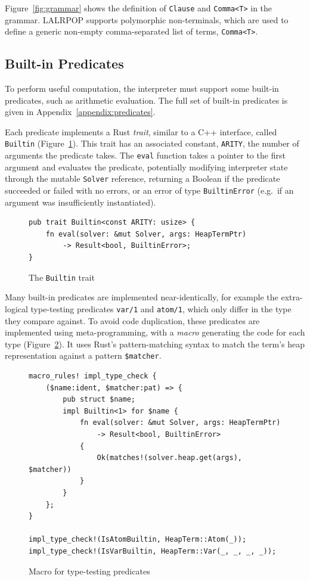 Figure~\ref{fig:grammar} shows the definition of \texttt{Clause} and \texttt{Comma<T>} in the grammar. LALRPOP supports polymorphic non-terminals, which are used to define a generic non-empty comma-separated list of terms, \texttt{Comma<T>}.

\subsection{Built-in Predicates}

\label{sec:builtins}

To perform useful computation, the interpreter must support some built-in predicates, such as arithmetic evaluation. The full set of built-in predicates is given in Appendix~\ref{appendix:predicates}.

Each predicate implements a Rust \emph{trait}, similar to a C++ interface, called \texttt{Builtin} (Figure~\ref{fig:builtin-trait}). This trait has an associated constant, \texttt{ARITY}, the number of arguments the predicate takes. The \texttt{eval} function takes a pointer to the first argument and evaluates the predicate, potentially modifying interpreter state through the mutable \texttt{Solver} reference, returning a Boolean if the predicate succeeded or failed with no errors, or an error of type \texttt{BuiltinError} (e.g.\ if an argument was insufficiently instantiated).

\begin{figure}[H]
\centering
\begin{verbatim}
pub trait Builtin<const ARITY: usize> {
    fn eval(solver: &mut Solver, args: HeapTermPtr)
        -> Result<bool, BuiltinError>;
}
\end{verbatim}
\caption{The \texttt{Builtin} trait}
\label{fig:builtin-trait}
\end{figure}

Many built-in predicates are implemented near-identically, for example the extra-logical type-testing predicates \texttt{var/1} and \texttt{atom/1}, which only differ in the type they compare against. To avoid code duplication, these predicates are implemented using meta-programming, with a \emph{macro} generating the code for each type (Figure~\ref{fig:builtin-macro}). It uses Rust's pattern-matching syntax to match the term's heap representation against a pattern \texttt{\$matcher}.

\begin{figure}[H]
\centering
\begin{verbatim}
macro_rules! impl_type_check {
    ($name:ident, $matcher:pat) => {
        pub struct $name;
        impl Builtin<1> for $name {
            fn eval(solver: &mut Solver, args: HeapTermPtr)
                -> Result<bool, BuiltinError>
            {
                Ok(matches!(solver.heap.get(args), $matcher))
            }
        }
    };
}

impl_type_check!(IsAtomBuiltin, HeapTerm::Atom(_));
impl_type_check!(IsVarBuiltin, HeapTerm::Var(_, _, _, _));
\end{verbatim}
\caption{Macro for type-testing predicates}
\label{fig:builtin-macro}
\end{figure}

